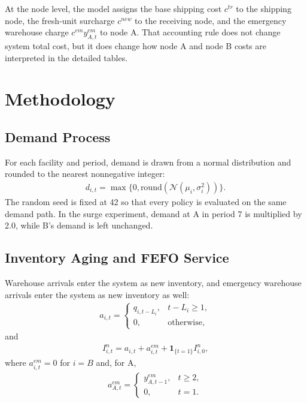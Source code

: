\documentclass[11pt]{article}
\begin{document}
At the node level, the model assigns the base shipping cost $c^{tr}$ to the shipping node, the fresh-unit surcharge $c^{new}$ to the receiving node, and the emergency warehouse charge $c^{em} y^{em}_{A,t}$ to node A. That accounting rule does not change system total cost, but it does change how node A and node B costs are interpreted in the detailed tables.

\section{Methodology}
\subsection{Demand Process}
For each facility and period, demand is drawn from a normal distribution and rounded to the nearest nonnegative integer:
\begin{align}
d_{i,t} = \max\{0,\text{round}(\mathcal{N}(\mu_i,\sigma_i^2))\}.
\end{align}
The random seed is fixed at 42 so that every policy is evaluated on the same demand path. In the surge experiment, demand at A in period 7 is multiplied by 2.0, while B's demand is left unchanged.

\subsection{Inventory Aging and FEFO Service}
Warehouse arrivals enter the system as new inventory, and emergency warehouse arrivals enter the system as new inventory as well:
\begin{align}
a_{i,t} =
\begin{cases}
q_{i,t-L_i}, & t-L_i \ge 1,\\
0, & \text{otherwise},
\end{cases}
\end{align}
and
\begin{align}
I^n_{i,t} = a_{i,t} + a^{em}_{i,t} + \mathbf{1}_{\{t=1\}} I^n_{i,0},
\end{align}
where $a^{em}_{i,t}=0$ for $i=B$ and, for A,
\begin{align}
a^{em}_{A,t} =
\begin{cases}
y^{em}_{A,t-1}, & t \ge 2,\\
0, & t=1.
\end{cases}
\end{align}
\end{document}
